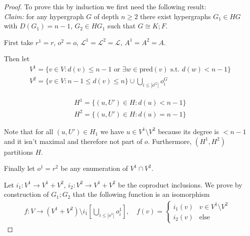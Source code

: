 \documentclass[12pt]{article}
\theoremstyle{definition}
\newcommand{\defeq}{\vcentcolon=}
\newcommand{\1}{\mathbbm{1}}
\renewcommand{\L}{\mathcal{L}}
\newcommand{\seq}{;}
\newcommand{\pred}{\text{pred}}
\begin{document}
\begin{proof}
    To prove this by induction we first need the following result:\\
    \emph{Claim:} for any hypergraph $G$ of depth $n \geq 2$ there exist hypergraphs $G_{1}\in HG$ with $D(G_1) = n-1$, $G_{2}\in HG_1$ such that $G \cong K\seq F$.

    First take $r^{1} = r$, $o^{2} = o$, $\L^{1} = \L^{2} = \L$, $A^{1} = A^{2} = A$.

    Then let
    \begin{align*}
        &V^1 = \{v\in V : d(v) \leq n-1 \text{ or } \exists w\in \pred(v) \text{ s.t. } d(w) < n-1\}\\
        &V^2 = \{v\in V : n-1 \leq d(v) \leq n\} \cup \bigcup_{i\leq |o^G|} o^G_i
    \end{align*}

    \begin{align*}
        &H^1 = \{(u,U')\in H : d(u) < n-1\}\\
        &H^2 = \{(u, U')\in H : d(u) = n-1\}
    \end{align*}

    Note that for all $(u,U') \in H_1$ we have $u\in V^1\setminus V^2$ because its degree is $< n-1$ and it isn't maximal and therefore not part of $o$. Furthermore, $(H^1, H^2)$ partitions $H$.

    Finally let $o^1 = r^2$ be any enumeration of $V^1\cap V^2$. 

    Let $i_1: V^1\to V^1 + V^2$, $i_2: V^2\to V^1 + V^2$ be the coproduct inclusions. We prove by construction of $G_1;G_2$ that the following function is an isomorphism
    \begin{align*}
        f: V\to (V^1 + V^2)\setminus i_1[\bigcup_{i\leq |o^1|}o^1_i], \quad f(v) = \begin{cases}
            i_1(v) & v\in V^1\setminus V^2\\
            i_2(v) & \text{else}
        \end{cases}
    \end{align*}



\end{proof}
\end{document}
